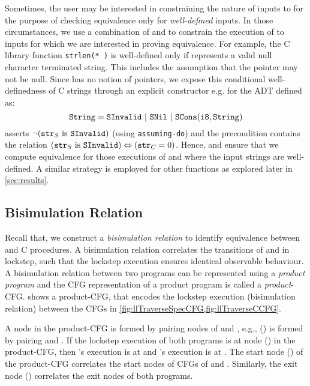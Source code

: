 Sometimes, the user may be interested in constraining the nature of inputs to \cprog{}
for the purpose of checking equivalence only for {\em well-defined} inputs.
In those circumstances, we use a combination of \pre{} and \sdef{} to constrain
the execution of \cprog{} to inputs for which we are interested in proving equivalence.
For example, the C library function {\tt strlen(* )} is well-defined only if 
represents a valid null character terminated string.
This includes the assumption that the pointer  may not be null.
Since \SpecL{} has no notion of pointers, we expose this conditional well-definedness of C strings
through an explicit constructor e.g.  for the  ADT defined as:
$$
\type{String}=\cons{SInvalid}\ |\ \cons{SNil}\ |\ \cons{SCons}(\type{i8}, \type{String})
$$
\sdef{} asserts $\neg({\tt str}_{S}\ \mathrm{is}\ {\tt SInvalid})$ (using {\tt assuming-do}) and
the precondition \pre{} contains the relation $({\tt str}_{S}\ \mathrm{is}\ {\tt SInvalid}) \Leftrightarrow ({\tt str}_{C}=0)$.
Hence, \sdef{} and \pre{} ensure that we compute equivalence for those
executions of \sprog{} and \cprog{} where the input strings are well-defined.
A similar strategy is employed for other functions as explored later in \cref{sec:results}.



\subsection{Bisimulation Relation}
\label{sec:bisim}
Recall that,
we construct a {\em bisimulation relation} to identify equivalence between \SpecL{} and C procedures.
A bisimulation relation correlates the transitions of \sprog{} and \cprog{} in lockstep, such that the
lockstep execution ensures identical observable behaviour.
A bisimulation relation between two programs can be represented using a {\em product program}
\cite{covac} and the CFG representation of a product program is called a {\em product}-CFG.
 shows a product-CFG, that encodes the lockstep execution
(bisimulation relation) between the CFGs in \cref{fig:llTraverseSpecCFG,fig:llTraverseCCFG}.

A node in the product-CFG is formed by pairing nodes of \sprog{} and \cprog{},
e.g., () is formed by pairing  and .
If the lockstep execution of both programs is at node () in the product-CFG,
then \sprog{}'s execution is at  and \cprog{}'s execution is at .
The start node () of the product-CFG correlates the start nodes of CFGs of \sprog{} and \cprog{}.
Similarly, the exit node () correlates the exit nodes of both programs.

